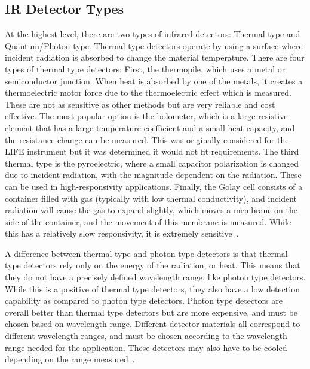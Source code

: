 \subsection{IR Detector Types}\label{IR_detector_types}
At the highest level, there are two types of infrared detectors: Thermal type and Quantum/Photon type. Thermal type detectors operate by using a surface where incident radiation is absorbed to change the material temperature. There are four types of thermal type detectors: First, the thermopile, which uses a metal or semiconductor junction. When heat is absorbed by one of the metals, it creates a thermoelectric motor force due to the thermoelectric effect which is measured. These are not as sensitive as other methods but are very reliable and cost effective. The most popular option is the bolometer, which is a large resistive element that has a large temperature coefficient and a small heat capacity, and the resistance change can be measured. This was originally considered for the LIFE instrument but it was determined it would not fit requirements. The third thermal type is the pyroelectric, where a small capacitor polarization is changed due to incident radiation, with the magnitude dependent on the radiation. These can be used in high-responsivity applications. Finally, the Golay cell consists of a container filled with gas (typically with low thermal conductivity), and incident radiation will cause the gas to expand slightly, which moves a membrane on the side of the container, and the movement of this membrane is measured. While this has a relatively slow responsivity, it is extremely sensitive~\citep{IR_detector_textbook}.

A difference between thermal type and photon type detectors is that thermal type detectors rely only on the energy of the radiation, or heat. This means that they do not have a precisely defined wavelength range, like photon type detectors. While this is a positive of thermal type detectors, they also have a low detection capability as compared to photon type detectors. Photon type detectors are overall better than thermal type detectors but are more expensive, and must be chosen based on wavelength range. Different detector materials all correspond to different wavelength ranges, and must be chosen according to the wavelength range needed for the application. These detectors may also have to be cooled depending on the range measured~\citep{hamamatsu_ir_detectors}.

